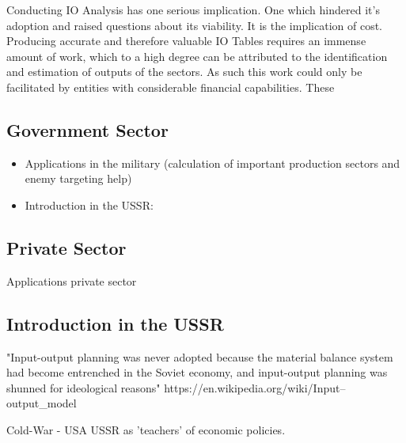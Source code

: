\documentclass[12pt,a4paper]{scrartcl}
\begin{document}


	Conducting IO Analysis has one serious implication. One which hindered it's adoption and raised questions about its viability. It is the implication of cost. Producing accurate and therefore valuable IO Tables requires an immense amount of work, which to a high degree can be attributed to the identification and estimation of outputs of the sectors. As such this work could only be facilitated by entities with considerable financial capabilities. These

	\subsection{Government Sector}
	
	\begin{itemize}
		\item Applications in the military (calculation of important production sectors and enemy targeting help)
		\item Introduction in the USSR: \cite{leontief1960niedergang}
	\end{itemize}
	
	\subsection{Private Sector}
	
	Applications private sector 
	
	\subsection{Introduction in the USSR} \label{ussr}
	"Input-output planning was never adopted because the material balance system had become entrenched in the Soviet economy, and input-output planning was shunned for ideological reasons" 
	 https://en.wikipedia.org/wiki/Input–output\_model
	
	Cold-War - USA USSR as 'teachers' of economic policies.\newline
	
\end{document}
